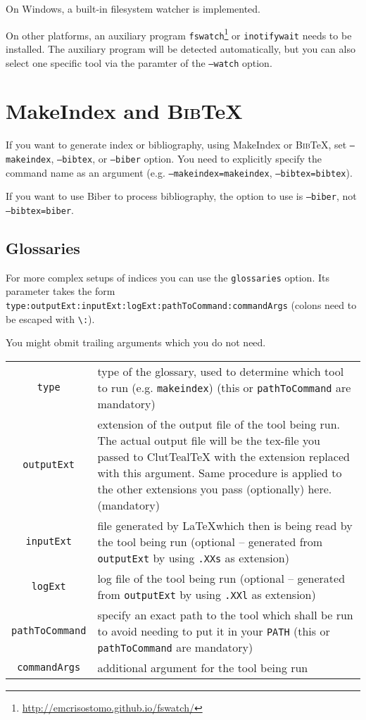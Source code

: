 \documentclass[a4paper]{report}
\newcommand\CluttealTeX{ClutTeal\TeX\xspace}
\providecommand\BibTeX{\textsc{Bib}\TeX\xspace}
\begin{document}
On Windows, a built-in filesystem watcher is implemented.

On other platforms, an auxiliary program \texttt{fswatch}\footnote{\url{http://emcrisostomo.github.io/fswatch/}} or \texttt{inotifywait} needs to be installed.
The auxiliary program will be detected automatically, but you can also select one specific tool via the paramter of the \texttt{--watch} option.

\section{MakeIndex and \BibTeX}
If you want to generate index or bibliography, using MakeIndex or \BibTeX, set \texttt{--makeindex}, \texttt{--bibtex}, or \texttt{--biber} option.
You need to explicitly specify the command name as an argument (e.g. \texttt{--makeindex=makeindex}, \texttt{--bibtex=bibtex}).

If you want to use Biber to process bibliography, the option to use is \texttt{--biber}, not \texttt{--bibtex=biber}.

\subsection{Glossaries}
\label{sec:glossaries}
For more complex setups of indices you can use the \texttt{glossaries} option.
Its parameter takes the form
\texttt{type:outputExt:inputExt:logExt:pathToCommand:commandArgs} (colons
need to be escaped with \texttt{\textbackslash{}:}).

You might obmit trailing arguments which you do not need.

\begin{tabularx}{\linewidth}{cX}
	\texttt{type} &
	type of the glossary, used to determine which tool to run (e.g. \texttt{makeindex})
	\newline
	(this or \texttt{pathToCommand} are mandatory)
	\\
	\texttt{outputExt} &
	extension of the output file of the tool being run. The actual output file will
	be the tex-file you passed to \CluttealTeX{} with the extension replaced
	with this argument.
	\newline
	Same procedure is applied to the other extensions you pass (optionally) here.
	\newline
	(mandatory)
	\\
	\texttt{inputExt} &
	file generated by \LaTeX which then is being read by the tool being run
	\newline
	(optional -- generated from \texttt{outputExt} by using \texttt{.XXs} as extension)
	\\
	\texttt{logExt} &
	log file of the tool being run
	(optional -- generated from \texttt{outputExt} by using \texttt{.XXl} as extension)
	\\
	\texttt{pathToCommand} &
	specify an exact path to the tool which shall be run to avoid needing to
	put it in your \texttt{PATH}
	\newline
	(this or \texttt{pathToCommand} are mandatory)
	\\
	\texttt{commandArgs} &
	additional argument for the tool being run
\end{tabularx}
\end{document}
